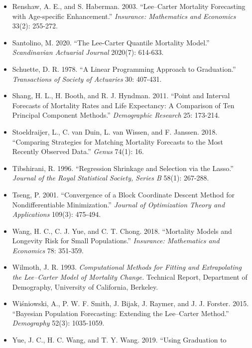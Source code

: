 \documentclass[UTF8, fontset=macnew, a4paper, 12pt]{ctexart}
\begin{document}
\begin{itemize}[leftmargin=2em, label={}, itemsep=3pt]
        the Lee--Carter Method: Adjusting for Smoothing and Lifespan
        Disparity.'' \textit{European Journal of Population} 37(1): 97-120.
  \item[] Renshaw, A. E., and S. Haberman. 2003. ``Lee--Carter Mortality
        Forecasting with Age-specific Enhancement.''
        \textit{Insurance: Mathematics and Economics} 33(2): 255-272.
  \item[] Santolino, M. 2020. ``The Lee-Carter Quantile Mortality Model.''
        \textit{Scandinavian Actuarial Journal} 2020(7): 614-633.
  \item[] Schuette, D. R. 1978. ``A Linear Programming Approach to
        Graduation.'' \textit{Transactions of Society of Actuaries}
        30: 407-431.
  \item[] Shang, H. L., H. Booth, and R. J. Hyndman. 2011. ``Point and Interval
        Forecasts of Mortality Rates and Life Expectancy: A Comparison of Ten
        Principal Component Methods.''
        \textit{Demographic Research} 25: 173-214.
  \item[] Stoeldraijer, L., C. van Duin, L. van Wissen, and F. Janssen. 2018.
        ``Comparing Strategies for Matching Mortality Forecasts to the Most
        Recently Observed Data.'' \textit{Genus} 74(1): 16.
  \item[] Tibshirani, R. 1996. ``Regression Shrinkage and Selection via the
        Lasso.'' \textit{Journal of the Royal Statistical Society, Series B}
        58(1): 267-288.
  \item[] Tseng, P. 2001. ``Convergence of a Block Coordinate Descent Method
        for Nondifferentiable Minimization.'' \textit{Journal of Optimization
        Theory and Applications} 109(3): 475-494.
  \item[] Wang, H. C., C. J. Yue, and C. T. Chong. 2018. ``Mortality Models and
        Longevity Risk for Small Populations.''
        \textit{Insurance: Mathematics and Economics} 78: 351-359.
  \item[] Wilmoth, J. R. 1993. \textit{Computational Methods for Fitting and
        Extrapolating the Lee--Carter Model of Mortality Change.} Technical
        Report, Department of Demography, University of California, Berkeley.
  \item[] Wi\'sniowski, A., P. W. F. Smith, J. Bijak, J. Raymer, and
        J. J. Forster. 2015. ``Bayesian Population Forecasting: Extending the
        Lee--Carter Method.'' \textit{Demography} 52(3): 1035-1059.
  \item[] Yue, J. C., H. C. Wang, and T. Y. Wang. 2019. ``Using Graduation to

\end{itemize}
\end{document}
